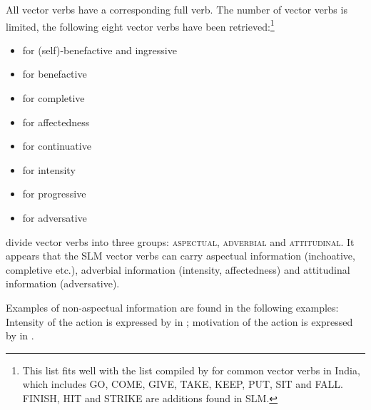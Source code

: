 All vector verbs have a corresponding full verb. The number of vector verbs is limited, the following eight vector verbs have been retrieved:\footnote{This list fits well with the list compiled by \citet[173f]{AbbiEtAl1991evc} for common vector verbs in India, which includes GO, COME, GIVE, TAKE, KEEP, PUT, SIT and FALL. FINISH, HIT and STRIKE are additions found in SLM.}

\begin{itemize}
 \item {} for (self)-benefactive and ingressive
 \item {} for benefactive
 \item {} for completive
 \item {} for affectedness
 \item {} for continuative
 \item {} for intensity
 \item {} for progressive
 \item {} for adversative 
\end{itemize}


\citet{AbbiEtAl1991evc} divide vector verbs into three groups: \textsc{aspectual}, \textsc{adverbial} and \textsc{attitudinal}. It appears that the SLM vector verbs can carry aspectual information (inchoative, completive etc.), adverbial information (intensity, affectedness) and  attitudinal information (adversative).

Examples of  non-aspectual information are found in the following examples: Intensity of the action is expressed by  in ; motivation of the action is expressed by  in .





